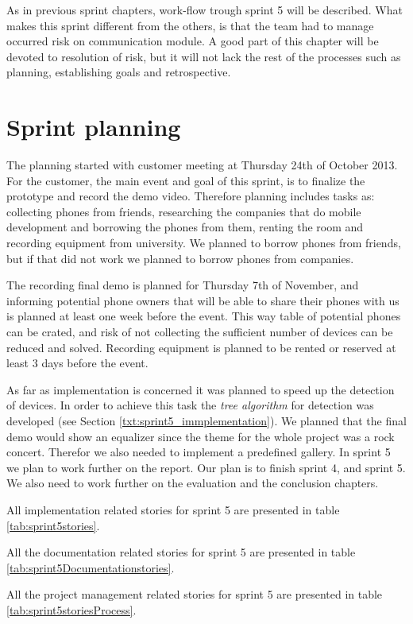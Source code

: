 As in previous sprint chapters, work-flow trough sprint 5 will be described. What makes this sprint different from the others, is that the team had to manage occurred risk on communication module. A good part of this chapter will be devoted to resolution of risk, but it will not lack the rest of the processes such as planning, establishing goals and retrospective.

\section{Sprint planning}

The planning started with customer meeting at Thursday 24th of October 2013. For the customer, the main event and goal of this sprint, is to finalize the prototype and record the demo video. Therefore planning includes tasks as: collecting phones from friends, researching the companies that do mobile development and borrowing the phones from them, renting the room and recording equipment from university. We planned to borrow phones from friends, but if that did not work we planned to borrow phones from companies.

 The recording final demo is planned for Thursday 7th of November, and informing potential phone owners that will be able to share their phones with us is planned at least one week before the event. This way table of potential phones can be crated, and risk of not collecting the sufficient number of devices can be reduced and solved. Recording equipment is planned to be rented or reserved at least 3 days before the event.

As far as implementation is concerned it was planned to speed up the detection of devices. In order to achieve this task the \textit{tree algorithm} for detection was developed (see Section \ref{txt:sprint5_immplementation}). We planned that the final demo would show an equalizer since the theme for the whole project was a rock concert. Therefor we also needed to implement a predefined gallery.
In sprint 5 we plan to work further on the report. Our plan is to finish sprint 4, and sprint 5. We also need to work further on the evaluation and the conclusion chapters.  

All implementation related stories for sprint 5 are presented in table \ref{tab:sprint5stories}.


All the documentation related stories for sprint 5 are presented in table \ref{tab:sprint5Documentationstories}.

All the project management related stories for sprint 5 are presented in table \ref{tab:sprint5storiesProcess}.


